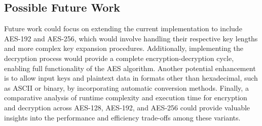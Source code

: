 \subsection{Possible Future Work}

Future work could focus on extending the current implementation to include AES-192 and AES-256, which would involve handling their respective key lengths and more complex key expansion procedures. 
Additionally, implementing the decryption process would provide a complete encryption-decryption cycle, enabling full functionality of the AES algorithm. 
Another potential enhancement is to allow input keys and plaintext data in formats other than hexadecimal, such as ASCII or binary, by incorporating automatic conversion methods. 
Finally, a comparative analysis of runtime complexity and execution time for encryption and decryption across AES-128, AES-192, and AES-256 could provide valuable insights into the performance and efficiency trade-offs among these variants.